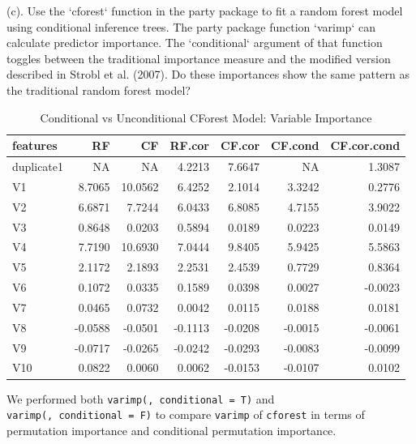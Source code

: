 \documentclass[]{report}
\begin{document}
\begin{subquestion}{(c).} Use the `cforest` function in the party package to fit a random forest model using conditional inference trees. The party package function `varimp` can calculate predictor importance. The `conditional` argument of that function toggles between the traditional importance measure and the modified version described in Strobl et al. (2007). Do these importances show the same pattern as the traditional random forest model?\end{subquestion}

\begin{table}[H]

\caption{\label{tab:unnamed-chunk-1}Conditional vs Unconditional CForest Model: Variable Importance}
\centering
\fontsize{8}{10}\selectfont
\begin{tabular}[t]{l|r|r|r|r|r|r}
\hline
\textbf{features} & \textbf{RF} & \textbf{CF} & \textbf{RF.cor} & \textbf{CF.cor} & \textbf{CF.cond} & \textbf{CF.cor.cond}\\
\hline
\rowcolor{gray!6}  duplicate1 & NA & NA & 4.2213 & 7.6647 & NA & 1.3087\\
\hline
V1 & 8.7065 & 10.0562 & 6.4252 & 2.1014 & 3.3242 & 0.2776\\
\hline
\rowcolor{gray!6}  V2 & 6.6871 & 7.7244 & 6.0433 & 6.8085 & 4.7155 & 3.9022\\
\hline
V3 & 0.8648 & 0.0203 & 0.5894 & 0.0189 & 0.0223 & 0.0149\\
\hline
\rowcolor{gray!6}  V4 & 7.7190 & 10.6930 & 7.0444 & 9.8405 & 5.9425 & 5.5863\\
\hline
V5 & 2.1172 & 2.1893 & 2.2531 & 2.4539 & 0.7729 & 0.8364\\
\hline
\rowcolor{gray!6}  V6 & 0.1072 & 0.0335 & 0.1589 & 0.0398 & 0.0027 & -0.0023\\
\hline
V7 & 0.0465 & 0.0732 & 0.0042 & 0.0115 & 0.0188 & 0.0181\\
\hline
\rowcolor{gray!6}  V8 & -0.0588 & -0.0501 & -0.1113 & -0.0208 & -0.0015 & -0.0061\\
\hline
V9 & -0.0717 & -0.0265 & -0.0242 & -0.0293 & -0.0083 & -0.0099\\
\hline
\rowcolor{gray!6}  V10 & 0.0822 & 0.0060 & 0.0062 & -0.0153 & -0.0107 & 0.0102\\
\hline
\end{tabular}
\end{table}

We performed both \texttt{varimp(,\ conditional\ =\ T)} and
\texttt{varimp(,\ conditional\ =\ F)} to compare \texttt{varimp} of
\texttt{cforest} in terms of permutation importance and conditional
permutation importance.
\end{document}
